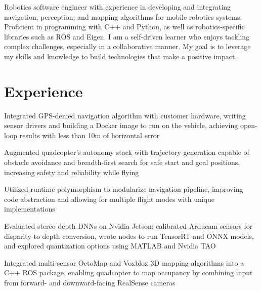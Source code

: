 \documentclass{resume}
\begin{document}


\begin{personalstatement}
  Robotics software engineer with experience in developing and integrating navigation,
  perception, and mapping algorithms for mobile robotics systems. Proficient in
  programming with C++ and Python, as well as robotics-specific libraries such as ROS and
  Eigen. I am a self-driven learner who enjoys tackling complex challenges, especially in
  a collaborative manner. My goal is to leverage my skills and knowledge to build
  technologies that make a positive impact.
\end{personalstatement}

\section{Experience}

\begin{details}
\item Integrated GPS-denied navigation algorithm with customer hardware, writing sensor drivers
  and building a Docker image to run on the vehicle, achieving open-loop results with
  less than 10m of horizontal error
\end{details}

\begin{details}
\item Augmented quadcopter’s autonomy stack with trajectory generation capable of
  obstacle avoidance and breadth-first search for safe start and goal positions,
  increasing safety and reliability while flying
\item Utilized runtime polymorphism to modularize navigation pipeline, improving code
  abstraction and allowing for multiple flight modes with unique implementations
\item Evaluated stereo depth DNNs on Nvidia Jetson; calibrated Arducam sensors for
  disparity to depth conversion, wrote nodes to run TensorRT and ONNX models, and
  explored quantization options using MATLAB and Nvidia TAO
\item Integrated multi-sensor OctoMap and Voxblox 3D mapping algorithms into a C++ ROS
  package, enabling quadcopter to map occupancy by combining input from forward- and
  downward-facing RealSense cameras
\end{details}
\end{document}
